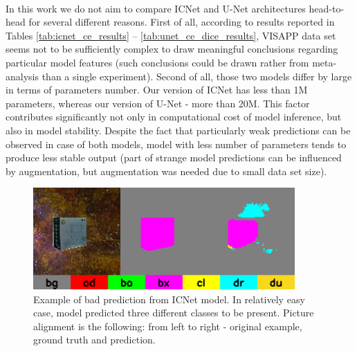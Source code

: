 \documentclass{article}
\begin{document}
\paragraph{}
In this work we do not aim to compare ICNet \cite{icnet} and U-Net \cite{unet} architectures head-to-head for several different reasons. First of all, according to results reported in Tables \ref{tab:icnet_ce_results} -- \ref{tab:unet_ce_dice_results}, VISAPP \cite{visapp} data set seems not to be sufficiently complex to draw meaningful conclusions regarding particular model features (such conclusions could be drawn rather from meta-analysis than a single experiment). Second of all, those two models differ by large in terms of parameters number. Our version of ICNet \cite{icnet} has less than 1M parameters, whereas our version of U-Net \cite{unet} - more than 20M. This factor contributes significantly not only in computational cost of model inference, but also in model stability. Despite the fact that particularly weak predictions can be observed in case of both models, model with less number of parameters tends to produce less stable output (part of strange model predictions can be influenced by augmentation, but augmentation was needed due to small data set size).

\begin{figure}
    \centering
  \includegraphics[width=10cm, keepaspectratio]{images/icnet_bad.png}
  \caption{Example of bad prediction from ICNet \cite{icnet} model. In relatively easy case, model predicted three different classes to be present. Picture alignment is the following: from left to right - original example, ground truth and prediction.}
  \label{fig:icnet_bad}
\end{figure}
\end{document}
